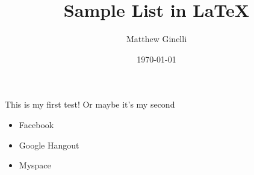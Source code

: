 \documentclass[a4paper,12pt]{article}
\title{Sample List in LaTeX}
\author{Matthew Ginelli}
\date{\today}
\begin{document}
\maketitle

This is my first test! Or maybe it's my second

\begin{itemize}
	\item Facebook
	\item Google Hangout
	\item Myspace
\end{itemize}
\end{document}
